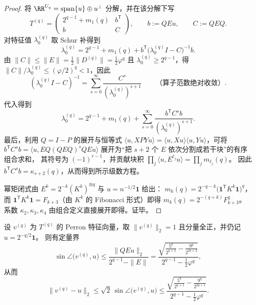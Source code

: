 \begin{proof}
将 \(\RR^{U_q}=\mathrm{span}\{u\}\oplus u^\perp\) 分解，并在该分解下写
\[
T^{(q)}=
\begin{pmatrix}
2^{q-1}+m_1(q) & b^{\mathsf T}\\
b & C
\end{pmatrix},
\qquad
b:=QEu,\qquad C:=QEQ.
\]
对特征值 \(\lambda_0^{(q)}\) 取 Schur 补得到
\[
\lambda_0^{(q)}=2^{q-1}+m_1(q)+b^{\mathsf T}\bigl(\lambda_0^{(q)}I-C\bigr)^{-1}b.
\]
由 \(\|C\|\le \|E\|=\frac12\|D^{(q)}\|=\frac12\varphi^q\) 且 \(\lambda_0^{(q)}\ge 2^{q-1}\)，得
\(
\|C\|/\lambda_0^{(q)}\le (\varphi/2)^q<1
\)，因此
\[
(\lambda_0^{(q)}I-C)^{-1}
=\sum_{s=0}^{\infty}\frac{C^s}{(\lambda_0^{(q)})^{s+1}}
\qquad\text{（算子范数绝对收敛）}.
\]
代入得到
\[
\lambda_0^{(q)}=2^{q-1}+m_1(q)+\sum_{s=0}^{\infty}\frac{b^{\mathsf T}C^s b}{(\lambda_0^{(q)})^{s+1}}.
\]
最后，利用 \(Q=I-P\) 的展开与恒等式
\(
\langle u,XPYu\rangle=\langle u,Xu\rangle\langle u,Yu\rangle
\)，可将 \(b^{\mathsf T}C^s b=\langle u,EQ(QEQ)^sQE u\rangle\) 展开为“把 \(s+2\) 个 \(E\) 依次分割成若干块”的有序组合求和，
其符号为 \((-1)^{r-1}\)，并贡献块积 \(\prod_j \langle u,E^{\ell_j}u\rangle=\prod_j m_{\ell_j}(q)\)。
因此 \(b^{\mathsf T}C^s b=\kappa_{s+2}(q)\)，从而得到所示级数方程。
\par
幂矩闭式由 \(E^k=2^{-k}(K^k)^{\otimes q}\) 与 \(u=n^{-1/2}\mathbf{1}\) 给出：
\(
m_k(q)=2^{-q-k}\bigl(\mathbf{1}^{\mathsf T}K^k\mathbf{1}\bigr)^q
\)，而 \(\mathbf{1}^{\mathsf T}K^k\mathbf{1}=F_{k+3}\)（由 \(K^k\) 的 Fibonacci 形式）即得 \(m_k(q)=2^{-(q+k)}F_{k+3}^q\)。
系数 \(\kappa_2,\kappa_3,\kappa_4\) 由组合定义直接展开即得。证毕。
\end{proof}

\begin{proposition}\label{prop:pom-replica-softcore-perron-eigenvector-uniformization-angle-bound}
设 \(v^{(q)}\) 为 \(T^{(q)}\) 的 Perron 特征向量，取 \(\|v^{(q)}\|_2=1\) 且分量全正，并仍记 \(u=2^{-q/2}\mathbf{1}\)。
则有定量界
\[
\sin\angle\bigl(v^{(q)},u\bigr)
\le
\frac{\|QEu\|_2}{2^{q-1}-\|E\|}
=
\frac{\sqrt{\frac{5^q}{2^{q+2}}-\frac{9^q}{2^{2q+2}}}}{2^{q-1}-\frac12\varphi^q},
\]
从而
\[
\|v^{(q)}-u\|_2\le \sqrt2\,\sin\angle\bigl(v^{(q)},u\bigr)
\le
\frac{\sqrt{\frac{5^q}{2^{q+1}}-\frac{9^q}{2^{2q+1}}}}{2^{q-1}-\frac12\varphi^q}.
\]
\end{proposition}

